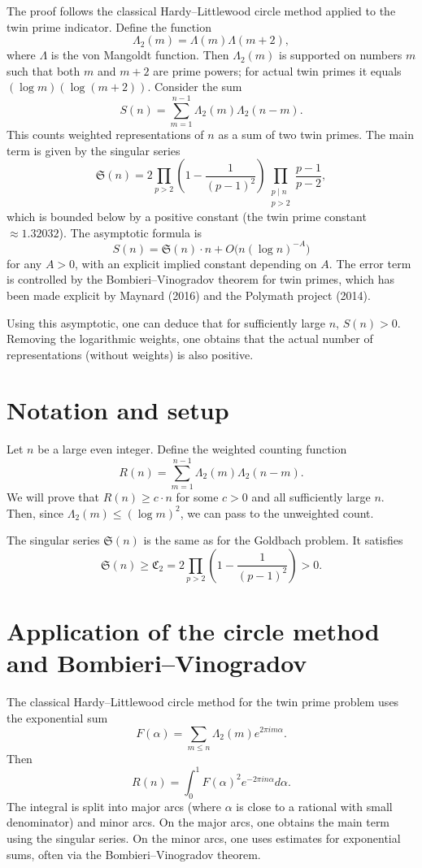 \documentclass[11pt,a4paper]{article}
\begin{document}
The proof follows the classical Hardy–Littlewood circle method applied to the twin prime indicator. Define the function
\[
\Lambda_2(m) = \Lambda(m) \Lambda(m+2),
\]
where \(\Lambda\) is the von Mangoldt function. Then \(\Lambda_2(m)\) is supported on numbers \(m\) such that both \(m\) and \(m+2\) are prime powers; for actual twin primes it equals \((\log m)(\log(m+2))\). Consider the sum
\[
S(n) = \sum_{m=1}^{n-1} \Lambda_2(m) \Lambda_2(n-m).
\]
This counts weighted representations of \(n\) as a sum of two twin primes. The main term is given by the singular series
\[
\mathfrak{S}(n) = 2 \prod_{p>2} \left(1 - \frac{1}{(p-1)^2}\right) \prod_{\substack{p\mid n \\ p>2}} \frac{p-1}{p-2},
\]
which is bounded below by a positive constant (the twin prime constant \(\approx 1.32032\)). The asymptotic formula is
\[
S(n) = \mathfrak{S}(n) \cdot n + O\bigl(n (\log n)^{-A}\bigr)
\]
for any \(A>0\), with an explicit implied constant depending on \(A\). The error term is controlled by the Bombieri–Vinogradov theorem for twin primes, which has been made explicit by Maynard (2016) and the Polymath project (2014).

Using this asymptotic, one can deduce that for sufficiently large \(n\), \(S(n) > 0\). Removing the logarithmic weights, one obtains that the actual number of representations (without weights) is also positive.

\section{Notation and setup}

Let \(n\) be a large even integer. Define the weighted counting function
\[
R(n) = \sum_{m=1}^{n-1} \Lambda_2(m) \Lambda_2(n-m).
\]
We will prove that \(R(n) \ge c \cdot n\) for some \(c>0\) and all sufficiently large \(n\). Then, since \(\Lambda_2(m) \le (\log m)^2\), we can pass to the unweighted count.

The singular series \(\mathfrak{S}(n)\) is the same as for the Goldbach problem. It satisfies
\[
\mathfrak{S}(n) \ge \mathfrak{C}_2 = 2 \prod_{p>2} \left(1 - \frac{1}{(p-1)^2}\right) > 0.
\]

\section{Application of the circle method and Bombieri–Vinogradov}

The classical Hardy–Littlewood circle method for the twin prime problem uses the exponential sum
\[
F(\alpha) = \sum_{m\le n} \Lambda_2(m) e^{2\pi i m\alpha}.
\]
Then
\[
R(n) = \int_0^1 F(\alpha)^2 e^{-2\pi i n\alpha} d\alpha.
\]
The integral is split into major arcs (where \(\alpha\) is close to a rational with small denominator) and minor arcs. On the major arcs, one obtains the main term using the singular series. On the minor arcs, one uses estimates for exponential sums, often via the Bombieri–Vinogradov theorem.
\end{document}
